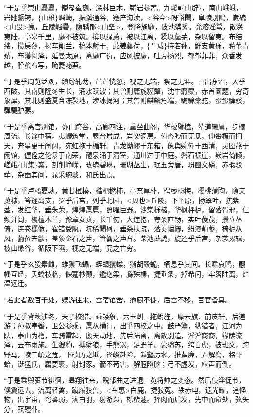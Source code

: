 \documentclass[]{article}
\begin{document}
``于是乎崇山矗矗，巃嵸崔巍，深林巨木，崭岩参差。九嵕■\{山辟\}，南山峨峨，岩阤甗锜，\{山椎\}崛崎，振溪通谷，蹇产沟渎，\textless{}谷今\textgreater{}呀豁閜，阜陵别隝，崴磈\textless{}山畏\textgreater{}廆，丘陵崛礨，隐辚郁\textless{}山垒\textgreater{}，登降施靡，陂池貏豸。允溶淫鬻，散涣夷陆，亭皋千里，靡不被筑。揜以绿蕙，被以江离，糅以蘼芜，杂以留夷。布结缕，攒戾莎，揭车衡兰，稿本射干，茈姜蘘荷，\{艹咸\}持若荪，鲜支黄砾，蒋芧青薠，布濩闳泽，延曼太原，离靡广衍，应风披靡，吐芳扬烈，郁郁菲菲，众香发越，肸蚃布写，晻薆咇茀。

``于是乎周览泛观，缜纷轧芴，芒芒恍忽，视之无端，察之无涯。日出东沼，入乎西陂。其南则隆冬生长，涌水跃波；其兽则庸旄貘犛，沈牛麝麋，赤首圜题，穷奇象犀。其北则盛夏含冻裂地，涉冰揭河；其兽则麒麟角端，騊駼橐驼，蛩蛩驒騱，驒騠驴骡。

``于是乎离宫别馆，弥山跨谷，高廊四注，重坐曲阁，华榱璧榼，辇道纚属，步櫩周流，长途中宿。夷嵕筑堂，累台增成，岩突洞房。俯杳眇而无见，仰攀橑而扪天，奔星更于闺闼，宛虹拖于楯轩。青龙蚴蟉于东箱，象舆婉僤于西清，灵圉燕于闲馆，偓佺之伦暴于南荣，醴泉涌于清室，通川过于中庭。磐石裖崖，嵚岩倚倾，嵯峨\{山集\}嶪，刻削峥嵘，玫瑰碧琳，珊瑚丛生，珉玉旁唐，玢豳文磷，赤瑕驳荦，杂臿其间，晁采琬琰，和氏出焉。

``于是乎卢橘夏孰，黄甘橙楱，楷杷橪柿，亭柰厚朴，梬枣杨梅，樱桃蒲陶，隐夫薁棣，答遝离支，罗乎后宫，列乎北园，\textless{}贝也\textgreater{}丘陵，下平原，扬翠叶，扤紫茎，发红华，垂朱荣，煌煌扈扈，照曜巨野。沙棠栎槠，华枫枰栌，留落胥邪，仁频并闾，欃檀木兰，豫章女贞，长千仞，大连抱，夸条直畅，实叶葰茂，攒立丛倚，连卷欐佹，崔错癹骫，坑稀閜砢，垂条扶疏，落英幡纚，纷溶萷蔘，猗柅从风，藰莅卉歙，盖象金石之声，管籥之声音。柴池茈虒，旋还乎后宫，杂袭累辑，被山缘谷，循阪下隰，视之无端，究之亡穷。

``于是乎玄猨素雌，蜼玃飞蠝，蛭蜩玃蝚，獑胡豰蛫，栖息乎其间。长啸哀鸣，翩幡互经，夭蟜枝格，偃蹇杪颠，逾绝梁，腾殊榛，捷垂条，掉希间，牢落陆离，烂温远迁。

``若此者数百千处，娱游往来，宫宿馆舍，疱厨不徙，后宫不移，百官备具。

``于是乎背秋涉冬，天子校猎。乘镂象，六玉虯，拖蜺旌，靡云旗，前皮轩，后道游；孙叔奉辔，卫公参乘，扈从横行，出乎四校之中。鼓严簿，纵猎者，江河为阹，泰山为橹，车骑雷起，殷天动地，先后陆离，离散别追，淫淫裔裔，缘陵流泽，云布雨施。生貔豹，搏豺狼，手熊罴，足野羊。蒙鹖苏，绔白虎，被斑文，跨野马，陵三嵕之危，下碛历之坻，径峻赴险，越壑厉水。推蜚廉，弄解廌，格虾蛤，铤猛氏，羂要褭，射封豕。箭不苟害，解脰陷脑；弓不虚发，应声而倒。

``于是乘舆弭节徘徊，皋翔往来，睨部曲之进退，览将帅之变态。然后侵淫促节，倏敻远去，流离轻禽，蹴履狡兽，\textless{}车惠\textgreater{}白鹿，捷狡菟。轶赤电，遗光耀，追怪物，出宇宙，弯蕃弱，满白羽，射游枭，栎蜚遽。择肉而后发，先中而命处，弦矢分，蓺殪仆。
\end{document}
